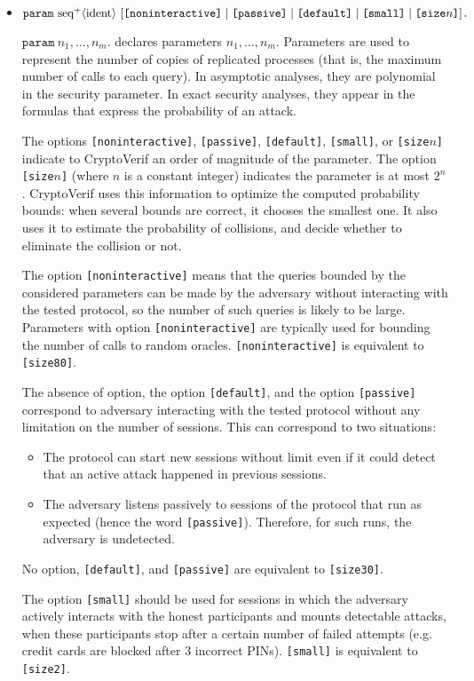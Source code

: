 \begin{itemize}
\item $\texttt{param}\ \neseq{ident}\ [\texttt{[noninteractive]}\mid \texttt{[passive]} \mid \texttt{[default]} \mid \texttt{[small]} \mid \texttt{[size$n$]}]\texttt{.}$

$\texttt{param}\ n_1, \ldots, n_m\texttt{.}$ declares parameters $n_1, \ldots, n_m$.
Parameters are used to represent the number of copies of replicated processes
(that is, the maximum number of calls to each query).
In asymptotic analyses, they are polynomial in the security parameter.
In exact security analyses, they appear in the formulas that express the
probability of an attack.

The options \texttt{[noninteractive]}, \texttt{[passive]}, \texttt{[default]}, \texttt{[small]}, or \texttt{[size$n$]}
indicate to CryptoVerif an order of magnitude of the parameter.
%
The option \texttt{[size$n$]} (where $n$ is a constant integer) indicates
the parameter is at most $2^n$.
CryptoVerif uses this
information to optimize the computed probability bounds: when several
bounds are correct, it chooses the smallest one.
It also uses it to estimate the probability of collisions,
and decide whether to eliminate the collision or not.

The option \texttt{[noninteractive]} means that
the queries bounded by the considered parameters can be made by the
adversary without interacting with the tested protocol, so the number
of such queries is likely to be large.
Parameters with option \texttt{[noninteractive]} are typically 
used for bounding the number of calls to random oracles.
\texttt{[noninteractive]} is equivalent to \texttt{[size80]}.

The absence of option, the option \texttt{[default]}, and the option \texttt{[passive]} correspond
to adversary interacting with the tested protocol without any limitation
on the number of sessions. This can correspond to two situations:
\begin{itemize}
\item The protocol can start new sessions without limit even 
  if it could detect that an active attack happened in previous sessions.
\item The adversary listens passively to sessions of the protocol that
  run as expected (hence the word \texttt{[passive]}). Therefore, for
  such runs, the adversary is undetected.
\end{itemize}
No option, \texttt{[default]}, and \texttt{[passive]} are equivalent to \texttt{[size30]}.

The option \texttt{[small]} should be used for sessions in which the
adversary actively interacts with the honest participants and mounts
detectable attacks, when these participants stop after a certain
number of failed attempts (e.g. credit cards are blocked after 3 incorrect
PINs).
\texttt{[small]} is equivalent to \texttt{[size2]}.


\end{itemize}
